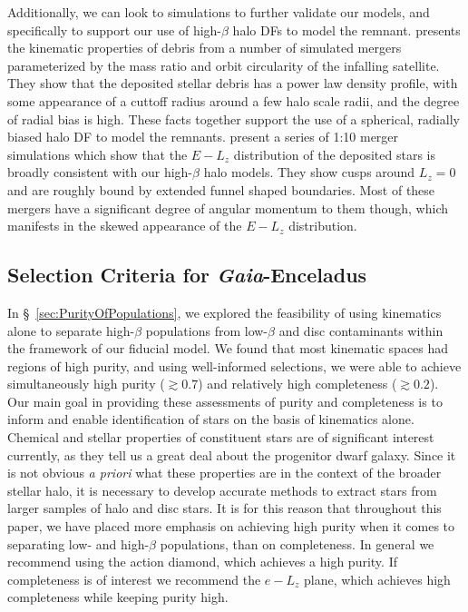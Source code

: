 Additionally, we can look to simulations to further validate our models, and specifically to support our use of high-$\beta$ halo DFs to model the \gse remnant. \textcite{amorisco17} presents the kinematic properties of debris from a number of simulated mergers parameterized by the mass ratio and orbit circularity of the infalling satellite. They show that the deposited stellar debris has a power law density profile, with some appearance of a cuttoff radius around a few halo scale radii, and the degree of radial bias is high. These facts together support the use of a spherical, radially biased halo DF to model the remnants. \textcite{jean-baptiste17} present a series of 1:10 merger simulations which show that the $E-L_{z}$ distribution of the deposited stars is broadly consistent with our high-$\beta$ halo models. They show cusps around $L_{z}=0$ and are roughly bound by extended funnel shaped boundaries. Most of these mergers have a significant degree of angular momentum to them though, which manifests in the skewed appearance of the $E-L_{z}$ distribution.

\subsection{Selection Criteria for \textit{Gaia}-Enceladus}

In \S~\ref{sec:PurityOfPopulations}, we explored the feasibility of using kinematics alone to separate high-$\beta$ populations from low-$\beta$ and disc contaminants within the framework of our fiducial model. We found that most kinematic spaces had regions of high purity, and using well-informed selections, we were able to achieve simultaneously high purity ($\gtrsim 0.7$) and relatively high completeness ($\gtrsim 0.2$). Our main goal in providing these assessments of purity and completeness is to inform and enable identification of \gse stars on the basis of kinematics alone. Chemical and stellar properties of \gse constituent stars are of significant interest currently, as they tell us a great deal about the progenitor dwarf galaxy. Since it is not obvious \textit{a priori} what these properties are in the context of the broader stellar halo, it is necessary to develop accurate methods to extract \gse stars from larger samples of halo and disc stars. It is for this reason that throughout this paper, we have placed more emphasis on achieving high purity when it comes to separating low- and high-$\beta$ populations, than on completeness. In general we recommend using the action diamond, which achieves a high purity. If completeness is of interest we recommend the $e-L_{z}$ plane, which achieves high completeness while keeping purity high.

